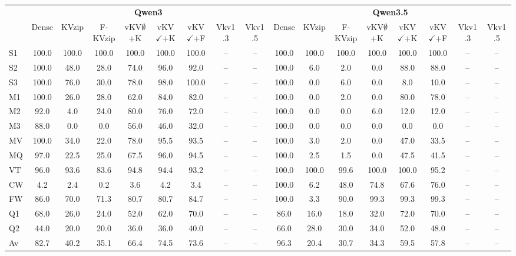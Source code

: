 \footnotesize
\setlength{\tabcolsep}{2.0pt}
\centering
\begin{tabular}{l|cccccccc|cccccccc}
\toprule
 & \multicolumn{8}{c|}{\textbf{Qwen3}} & \multicolumn{8}{c}{\textbf{Qwen3.5}} \\
 & Dense & KVzip & F-KVzip & vKV$\emptyset$+K & vKV$\checkmark$+K & vKV$\checkmark$+F & Vkv1 .3 & Vkv1 .5 & Dense & KVzip & F-KVzip & vKV$\emptyset$+K & vKV$\checkmark$+K & vKV$\checkmark$+F & Vkv1 .3 & Vkv1 .5 \\
\midrule
S1 & 100.0 & 100.0 & 100.0 & 100.0 & 100.0 & 100.0 & -- & -- & 100.0 & 100.0 & 100.0 & 100.0 & 100.0 & 100.0 & -- & -- \\
S2 & 100.0 & 48.0 & 28.0 & 74.0 & 96.0 & 92.0 & -- & -- & 100.0 & 6.0 & 2.0 & 0.0 & 88.0 & 88.0 & -- & -- \\
S3 & 100.0 & 76.0 & 30.0 & 78.0 & 98.0 & 100.0 & -- & -- & 100.0 & 0.0 & 6.0 & 0.0 & 8.0 & 10.0 & -- & -- \\
M1 & 100.0 & 26.0 & 28.0 & 62.0 & 84.0 & 82.0 & -- & -- & 100.0 & 0.0 & 2.0 & 0.0 & 80.0 & 78.0 & -- & -- \\
M2 & 92.0 & 4.0 & 24.0 & 80.0 & 76.0 & 72.0 & -- & -- & 100.0 & 0.0 & 0.0 & 6.0 & 12.0 & 12.0 & -- & -- \\
M3 & 88.0 & 0.0 & 0.0 & 56.0 & 46.0 & 32.0 & -- & -- & 100.0 & 0.0 & 0.0 & 0.0 & 0.0 & 0.0 & -- & -- \\
MV & 100.0 & 34.0 & 22.0 & 78.0 & 95.5 & 93.5 & -- & -- & 100.0 & 3.0 & 2.0 & 0.0 & 47.0 & 33.5 & -- & -- \\
MQ & 97.0 & 22.5 & 25.0 & 67.5 & 96.0 & 94.5 & -- & -- & 100.0 & 2.5 & 1.5 & 0.0 & 47.5 & 41.5 & -- & -- \\
VT & 96.0 & 93.6 & 83.6 & 94.8 & 94.4 & 93.2 & -- & -- & 100.0 & 100.0 & 99.6 & 100.0 & 100.0 & 95.2 & -- & -- \\
CW & 4.2 & 2.4 & 0.2 & 3.6 & 4.2 & 3.4 & -- & -- & 100.0 & 6.2 & 48.0 & 74.8 & 67.6 & 76.0 & -- & -- \\
FW & 86.0 & 70.0 & 71.3 & 80.7 & 80.7 & 84.7 & -- & -- & 100.0 & 3.3 & 90.0 & 99.3 & 99.3 & 99.3 & -- & -- \\
Q1 & 68.0 & 26.0 & 24.0 & 52.0 & 62.0 & 70.0 & -- & -- & 86.0 & 16.0 & 18.0 & 32.0 & 72.0 & 70.0 & -- & -- \\
Q2 & 44.0 & 20.0 & 20.0 & 36.0 & 36.0 & 40.0 & -- & -- & 66.0 & 28.0 & 30.0 & 34.0 & 52.0 & 48.0 & -- & -- \\
\midrule
Av & 82.7 & 40.2 & 35.1 & 66.4 & 74.5 & 73.6 & -- & -- & 96.3 & 20.4 & 30.7 & 34.3 & 59.5 & 57.8 & -- & -- \\
\bottomrule
\end{tabular}
\vspace{0.9em}

